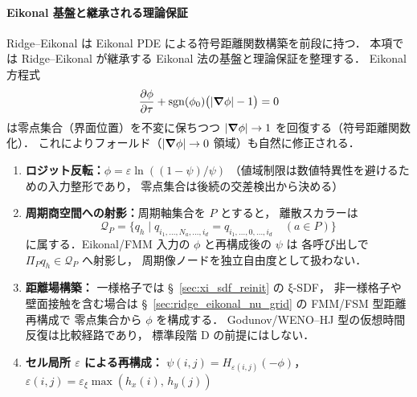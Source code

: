 \paragraph*{Eikonal 基盤と継承される理論保証}
Ridge--Eikonal は Eikonal PDE による符号距離関数構築を前段に持つ．
本項では Ridge--Eikonal が継承する Eikonal 法の基盤と理論保証を整理する．
Eikonal 方程式 \cite{Sussman1994}
\begin{equation}
  \frac{\partial\phi}{\partial\tau} + \operatorname{sgn}(\phi_0)\bigl(|\bm{\nabla}\phi| - 1\bigr) = 0
  \label{eq:eikonal_pde}
\end{equation}
は零点集合（界面位置）を不変に保ちつつ $|\bm{\nabla}\phi| \to 1$ を回復する（符号距離関数化）．
これによりフォールド（$|\bm{\nabla}\phi|\to 0$ 領域）も自然に修正される．

\begin{tcolorbox}[algbox, title={Ridge--Eikonal 距離再構成の基本手順}]
\begin{enumerate}
  \item \textbf{ロジット反転：}$\phi = \varepsilon\ln((1-\psi)/\psi)$
        （値域制限は数値特異性を避けるための入力整形であり，
        零点集合は後続の交差検出から決める）
  \item \textbf{周期商空間への射影：}周期軸集合を $P$ とすると，
        離散スカラーは
        \begin{equation}
          \mathcal{Q}_P
          =
          \{q_h\mid
          q_{i_1,\ldots,N_a,\ldots,i_d}
          =
          q_{i_1,\ldots,0,\ldots,i_d}\quad (a\in P)\}
          \label{eq:periodic_quotient_space}
        \end{equation}
        に属する．Eikonal/FMM 入力の $\phi$ と再構成後の $\psi$ は
        各呼び出しで $\Pi_P q_h\in\mathcal{Q}_P$ へ射影し，
        周期像ノードを独立自由度として扱わない．
  \item \textbf{距離場構築：}
        一様格子では §~\ref{sec:xi_sdf_reinit} の ξ-SDF，
        非一様格子や壁面接触を含む場合は
        §~\ref{sec:ridge_eikonal_nu_grid} の FMM/FSM 型距離再構成で
        零点集合から $\phi$ を構成する．
        Godunov/WENO--HJ 型の仮想時間反復は比較経路であり，
        標準段階 D の前提にはしない．
  \item \textbf{セル局所 $\varepsilon$ による再構成：}
        $\psi(i,j) = H_{\varepsilon(i,j)}(-\phi)$，
        $\varepsilon(i,j) = \varepsilon_\xi\max(h_x(i),\,h_y(j))$


\end{enumerate}
\end{tcolorbox}
